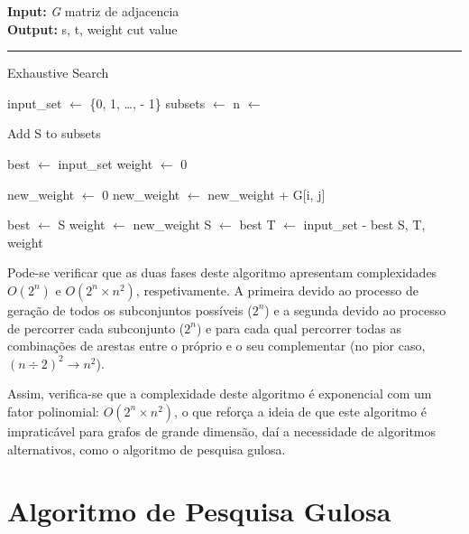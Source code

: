 \documentclass[mirror]{revdetua}
\begin{document}
\begin{algorithm}
    \raggedright
    \textbf{Input:} \textit{G} matriz de adjacencia \\
    \textbf{Output:} s, t, weight cut value \\
    \hrule 
    \caption{Exhaustive Search}
    \begin{algorithmic}[1]
        \State input\_set $\gets$ \{0, 1, \ldots,  - 1\}
        \State subsets $\gets$ 
        \State n $\gets$ 
        
            \State Add S to subsets
            \EndFor
        \EndFor
        
        \State best $\gets$ input\_set
        \State weight $\gets$ 0
        
            \State new\_weight $\gets$ 0
                    \State new\_weight $\gets$ new\_weight + G[i, j]
                \EndFor
            \EndFor
            
            \State best $\gets$ S
            \State weight $\gets$ new\_weight
            \EndIf
        \EndFor
        \State S $\gets$ best
        \State T $\gets$ input\_set - best
        \State \Return S, T, weight
    \end{algorithmic}
\end{algorithm}


Pode-se verificar que as duas fases deste algoritmo apresentam complexidades $O(2^n)$ e $O(2^n \times n^2)$, respetivamente. A primeira devido ao processo de geração de todos os subconjuntos possíveis ($2^n$) e a segunda devido ao processo de percorrer cada subconjunto ($2^n$) e para cada qual percorrer todas as combinações de arestas entre o próprio e o seu complementar (no pior caso, $(n \div 2)^2 \rightarrow n^2$).

Assim, verifica-se que a complexidade deste algoritmo é exponencial com um fator polinomial: $O(2^n \times n^2)$, o que reforça a ideia de que este algoritmo é impraticável para grafos de grande dimensão, daí a necessidade de algoritmos alternativos, como o algoritmo de pesquisa gulosa.


\section{Algoritmo de Pesquisa Gulosa}
\end{document}
